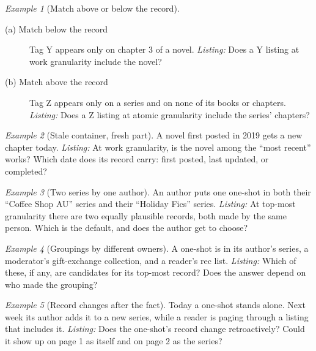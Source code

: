 \documentclass{amsart}
\theoremstyle{remark}
\newtheorem{eg}{Example}
\begin{document}
    \begin{eg}[Match above or below the record]\label{eg:match-level}
        \begin{description}
          \item[(a) Match below the record] Tag Y appears only on chapter 3 of a novel.
          \emph{Listing:} Does a Y listing at work granularity include the novel?
          \item[(b) Match above the record] Tag Z appears only on a series and on none of its books or chapters.
          \emph{Listing:} Does a Z listing at atomic granularity include the series' chapters?
        \end{description}
    \end{eg}
    \begin{eg}[Stale container, fresh part]\label{eg:recency}
        A novel first posted in 2019 gets a new chapter today.
        \emph{Listing:} At work granularity, is the novel among the ``most recent'' works? Which date does its record carry: first posted, last updated, or completed?
    \end{eg}
    \begin{eg}[Two series by one author]\label{eg:two-series}
        An author puts one one-shot in both their ``Coffee Shop AU'' series and their ``Holiday Fics'' series.
        \emph{Listing:} At top-most granularity there are two equally plausible records, both made by the same person. Which is the default, and does the author get to choose?
    \end{eg}
    \begin{eg}[Groupings by different owners]\label{eg:mixed-owners}
        A one-shot is in its author's series, a moderator's gift-exchange collection, and a reader's rec list.
        \emph{Listing:} Which of these, if any, are candidates for its top-most record? Does the answer depend on who made the grouping?
    \end{eg}
    \begin{eg}[Record changes after the fact]\label{eg:record-drift}
        Today a one-shot stands alone. Next week its author adds it to a new series, while a reader is paging through a listing that includes it.
        \emph{Listing:} Does the one-shot's record change retroactively? Could it show up on page 1 as itself and on page 2 as the series?
    \end{eg}
\end{document}
